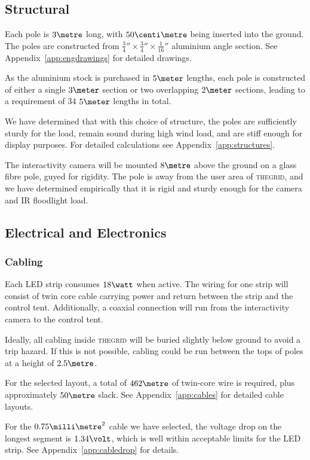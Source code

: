 \documentclass[12pt]{article} %
\newcommand{\thegrid}{\textsc{the\textperiodcentered grid}\xspace}
\begin{document}
\subsection{Structural}
Each pole is $3\metre$ long, with $50\centi\metre$ being inserted into the
ground.  The poles are constructed from $\frac{3}{4}'' \times \frac{3}{4}''
\times \frac{1}{16}''$ aluminium angle section.  See
Appendix~\ref{app:engdrawings} for detailed drawings.

As the aluminium stock is purchased in $5\meter$ lengths, each pole is
constructed of either a single $3\meter$ section or two overlapping $2\meter$
sections, leading to a requirement of 34 $5\meter$ lengths in total.

We have determined that with this choice of structure, the poles are
sufficiently sturdy for the load, remain sound during high wind load, and are
stiff enough for display purposes.  For detailed calculations see
Appendix~\ref{app:structures}.

The interactivity camera will be mounted $8\metre$ above the ground on a
glass fibre pole, guyed for rigidity.  The pole is away from the user
area of \thegrid, and we have determined empirically that it is rigid and
sturdy enough for the camera and IR floodlight load.

\subsection{Electrical and Electronics}
\subsubsection{Cabling}
Each LED strip consumes $18\watt$ when active.  The wiring for one strip will
consist of twin core cable carrying power and return between the strip and the
control tent.  Additionally, a coaxial connection will run from the
interactivity camera to the control tent.

Ideally, all cabling inside \thegrid will be buried slightly below ground to
avoid a trip hazard.  If this is not possible, cabling could be run between the
tops of poles at a height of $2.5\metre$.

For the selected layout, a total of $462\metre$ of twin-core wire is required,
plus approximately $50\metre$ slack. See Appendix~\ref{app:cables} for detailed
cable layouts.

For the $0.75\milli\metre^2$ cable we have selected, the voltage drop on the
longest segment is $1.34\volt$, which is well within acceptable limits for the
LED strip. See Appendix~\ref{app:cabledrop} for details.
\end{document}
